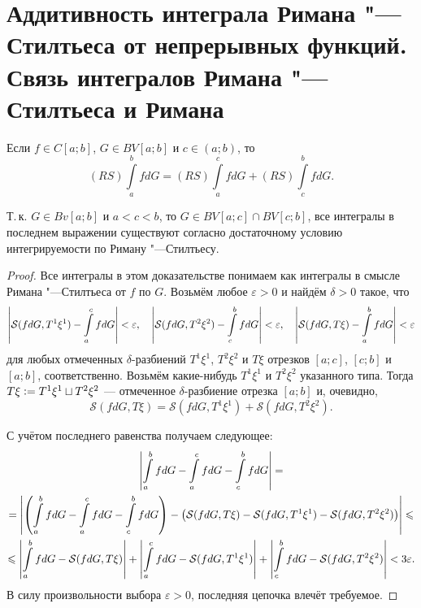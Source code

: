 \section{Аддитивность интеграла Римана "---Стилтьеса от непрерывных функций. Связь интегралов Римана "---Стилтьеса и Римана}

\begin{theorem}
    Если $f \in C[a; b]$, $G \in BV[a; b]$ и $c \in (a; b)$, то
    \[
        (RS)\int\limits_a^bfdG = (RS)\int\limits_a^cfdG + (RS)\int\limits_c^bfdG.
    \]
\end{theorem}

\begin{remark}
    Т.\,к. $G \in Bv[a; b]$ и $a < c < b$, то $G \in BV[a; c] \cap BV[c; b]$, все интегралы в последнем выражении существуют согласно достаточному условию интегрируемости по Риману "---Стилтьесу.
\end{remark}

\begin{proof}
    Все интегралы в этом доказательстве понимаем как интегралы в смысле Римана "---Стилтьеса от $f$ по $G$. Возьмём любое $\varepsilon > 0$ и найдём $\delta > 0$ такое, что
    \[
        \left\lvert\mathcal{S}(fdG, T^1\xi^1) - \int\limits_a^cfdG\right\rvert < \varepsilon,\quad\left\lvert\mathcal{S}(fdG, T^2\xi^2) - \int\limits_c^bfdG\right\rvert < \varepsilon,\quad\left\lvert\mathcal{S}(fdG, T\xi) - \int\limits_a^bfdG\right\rvert < \varepsilon
    \]
    для любых отмеченных $\delta$-разбиений $T^1\xi^1$, $T^2\xi^2$ и $T\xi$ отрезков $[a; c]$, $[c; b]$ и $[a; b]$, соответственно. Возьмём какие-нибудь $T^1\xi^1$ и $T^2\xi^2$ указанного типа. Тогда $T\xi \vcentcolon = T^1\xi^1 \sqcup T^2\xi^2$ --- отмеченное $\delta$-разбиение отрезка $[a; b]$ и, очевидно,
    \[
        \mathcal{S}(fdG, T\xi) = \mathcal{S}(fdG, T^1\xi^1) + \mathcal{S}(fdG, T^2\xi^2).
    \]

    С учётом последнего равенства получаем следующее:
    \begin{multline*}
        \left\lvert\int\limits_a^bfdG - \int\limits_a^cfdG - \int\limits_c^bfdG\right\rvert =\\ = \left\lvert\left(\int\limits_a^bfdG - \int\limits_a^cfdG - \int\limits_c^bfdG\right) - \left(\mathcal{S}(fdG, T\xi) - \mathcal{S}(fdG, T^1\xi^1) - \mathcal{S}(fdG, T^2\xi^2)\right)\right\rvert \leqslant\\ \leqslant \left\lvert\int\limits_a^bfdG - \mathcal{S}(fdG, T\xi)\right\rvert + \left\lvert\int\limits_a^cfdG - \mathcal{S}(fdG, T^1\xi^1)\right\rvert + \left\lvert\int\limits_c^bfdG - \mathcal{S}(fdG, T^2\xi^2)\right\rvert < 3\varepsilon.
    \end{multline*}
    В силу произвольности выбора $\varepsilon > 0$, последняя цепочка влечёт требуемое.
\end{proof}

